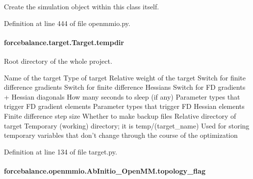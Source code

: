 Create the simulation object within this class itself. 



Definition at line 444 of file openmmio.\-py.

\hypertarget{classforcebalance_1_1target_1_1Target_aa1f01b5b78db253b5b66384ed11ed193}{
\paragraph[{tempdir}]{\setlength{\rightskip}{0pt plus 5cm}forcebalance.\-target.\-Target.\-tempdir\hspace{0.3cm}{\ttfamily [inherited]}}}\label{classforcebalance_1_1target_1_1Target_aa1f01b5b78db253b5b66384ed11ed193}


Root directory of the whole project. 

Name of the target Type of target Relative weight of the target Switch for finite difference gradients Switch for finite difference Hessians Switch for F\-D gradients + Hessian diagonals How many seconds to sleep (if any) Parameter types that trigger F\-D gradient elements Parameter types that trigger F\-D Hessian elements Finite difference step size Whether to make backup files Relative directory of target Temporary (working) directory; it is temp/(target\-\_\-name) Used for storing temporary variables that don't change through the course of the optimization 

Definition at line 134 of file target.\-py.

\hypertarget{classforcebalance_1_1openmmio_1_1AbInitio__OpenMM_ab4e95ab839ecd731ac7805c8a3ed08aa}{
\paragraph[{topology\-\_\-flag}]{\setlength{\rightskip}{0pt plus 5cm}forcebalance.\-openmmio.\-Ab\-Initio\-\_\-\-Open\-M\-M.\-topology\-\_\-flag}}\label{classforcebalance_1_1openmmio_1_1AbInitio__OpenMM_ab4e95ab839ecd731ac7805c8a3ed08aa}


